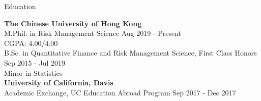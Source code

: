 \documentclass{resume} %
\begin{document}

\begin{rSection}{Education}

{\bf The Chinese University of Hong Kong} \\
M.Phil. in Risk Management Science \hfill {Aug 2019 - Present} \\
CGPA: 4.00/4.00 \smallskip \\
B.Sc. in Quantitative Finance and Risk Management Science, First Class Honors \hfill {Sep 2015 - Jul 2019} \\
Minor in Statistics \smallskip \\
{\bf University of California, Davis} \\
Academic Exchange, UC Education Abroad Program  \hfill {Sep 2017 - Dec 2017}

\end{rSection}

\end{document}
